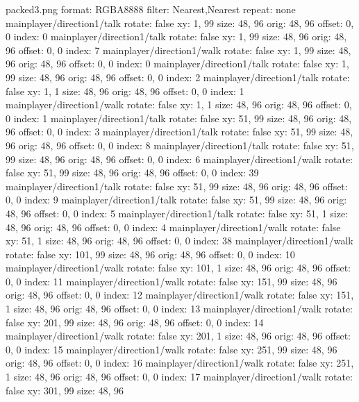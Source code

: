 packed3.png
format: RGBA8888
filter: Nearest,Nearest
repeat: none
mainplayer/direction1/talk
  rotate: false
  xy: 1, 99
  size: 48, 96
  orig: 48, 96
  offset: 0, 0
  index: 0
mainplayer/direction1/talk
  rotate: false
  xy: 1, 99
  size: 48, 96
  orig: 48, 96
  offset: 0, 0
  index: 7
mainplayer/direction1/walk
  rotate: false
  xy: 1, 99
  size: 48, 96
  orig: 48, 96
  offset: 0, 0
  index: 0
mainplayer/direction1/talk
  rotate: false
  xy: 1, 99
  size: 48, 96
  orig: 48, 96
  offset: 0, 0
  index: 2
mainplayer/direction1/talk
  rotate: false
  xy: 1, 1
  size: 48, 96
  orig: 48, 96
  offset: 0, 0
  index: 1
mainplayer/direction1/walk
  rotate: false
  xy: 1, 1
  size: 48, 96
  orig: 48, 96
  offset: 0, 0
  index: 1
mainplayer/direction1/talk
  rotate: false
  xy: 51, 99
  size: 48, 96
  orig: 48, 96
  offset: 0, 0
  index: 3
mainplayer/direction1/talk
  rotate: false
  xy: 51, 99
  size: 48, 96
  orig: 48, 96
  offset: 0, 0
  index: 8
mainplayer/direction1/talk
  rotate: false
  xy: 51, 99
  size: 48, 96
  orig: 48, 96
  offset: 0, 0
  index: 6
mainplayer/direction1/walk
  rotate: false
  xy: 51, 99
  size: 48, 96
  orig: 48, 96
  offset: 0, 0
  index: 39
mainplayer/direction1/talk
  rotate: false
  xy: 51, 99
  size: 48, 96
  orig: 48, 96
  offset: 0, 0
  index: 9
mainplayer/direction1/talk
  rotate: false
  xy: 51, 99
  size: 48, 96
  orig: 48, 96
  offset: 0, 0
  index: 5
mainplayer/direction1/talk
  rotate: false
  xy: 51, 1
  size: 48, 96
  orig: 48, 96
  offset: 0, 0
  index: 4
mainplayer/direction1/walk
  rotate: false
  xy: 51, 1
  size: 48, 96
  orig: 48, 96
  offset: 0, 0
  index: 38
mainplayer/direction1/walk
  rotate: false
  xy: 101, 99
  size: 48, 96
  orig: 48, 96
  offset: 0, 0
  index: 10
mainplayer/direction1/walk
  rotate: false
  xy: 101, 1
  size: 48, 96
  orig: 48, 96
  offset: 0, 0
  index: 11
mainplayer/direction1/walk
  rotate: false
  xy: 151, 99
  size: 48, 96
  orig: 48, 96
  offset: 0, 0
  index: 12
mainplayer/direction1/walk
  rotate: false
  xy: 151, 1
  size: 48, 96
  orig: 48, 96
  offset: 0, 0
  index: 13
mainplayer/direction1/walk
  rotate: false
  xy: 201, 99
  size: 48, 96
  orig: 48, 96
  offset: 0, 0
  index: 14
mainplayer/direction1/walk
  rotate: false
  xy: 201, 1
  size: 48, 96
  orig: 48, 96
  offset: 0, 0
  index: 15
mainplayer/direction1/walk
  rotate: false
  xy: 251, 99
  size: 48, 96
  orig: 48, 96
  offset: 0, 0
  index: 16
mainplayer/direction1/walk
  rotate: false
  xy: 251, 1
  size: 48, 96
  orig: 48, 96
  offset: 0, 0
  index: 17
mainplayer/direction1/walk
  rotate: false
  xy: 301, 99
  size: 48, 96
